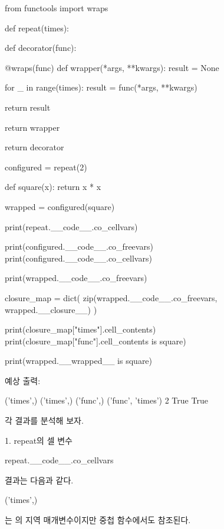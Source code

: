 \begin{dhkcode}
from functools import wraps

def repeat(times):

    def decorator(func):

        @wraps(func)
        def wrapper(*args, **kwargs):
            result = None

            for _ in range(times):
                result = func(*args, **kwargs)

            return result

        return wrapper

    return decorator


configured = repeat(2)


def square(x):
    return x * x


wrapped = configured(square)

print(repeat.__code__.co_cellvars)

print(configured.__code__.co_freevars)
print(configured.__code__.co_cellvars)

print(wrapped.__code__.co_freevars)

closure_map = dict(
    zip(wrapped.__code__.co_freevars, wrapped.__closure__)
)

print(closure_map["times"].cell_contents)
print(closure_map["func"].cell_contents is square)

print(wrapped.__wrapped__ is square)
\end{dhkcode}

예상 출력:

\begin{dhkzsh}
('times',)
('times',)
('func',)
('func', 'times')
2
True
True
\end{dhkzsh}

각 결과를 분석해 보자.

\begin{dhknote}
\begin{dhksmry}[centered]
1. repeat의 셀 변수
\end{dhksmry}
\end{dhknote}

\begin{dhkcode}
repeat.__code__.co_cellvars
\end{dhkcode}

결과는 다음과 같다.

\begin{dhkzsh}
('times',)
\end{dhkzsh}

는 의 지역 매개변수이지만 중첩 함수에서도 참조된다.


